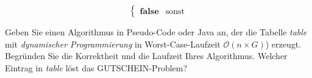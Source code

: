 \documentclass{lehramt-informatik-aufgabe}
\begin{document}
\begin{enumerate}
\begin{liAntwort}
\begin{equation*}
\begin{cases}
\textbf{false} & \text{sonst}
\end{cases}
\end{equation*}
\end{liAntwort}

Geben Sie einen Algorithmus in Pseudo-Code oder Java an, der die Tabelle
\emph{table} mit \emph{dynamischer Programmierung} in
Worst-Case-Laufzeit $\mathcal{O}(n \times G)$) erzeugt. Begründen Sie
die Korrektheit und die Laufzeit Ihres Algorithmus. Welcher Eintrag in
\emph{table} löst das GUTSCHEIN-Problem?

\end{enumerate}
\end{document}
